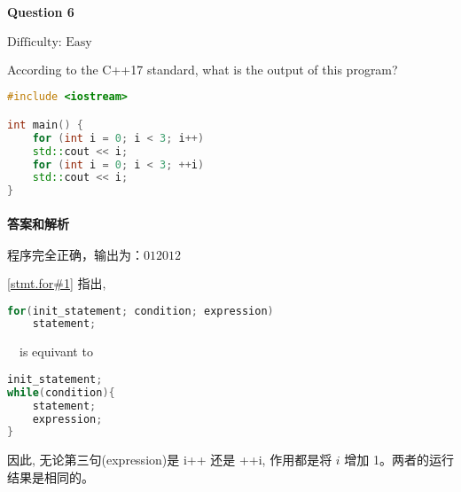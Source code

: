 \documentclass{article}
\begin{document}
	\paragraph*{Question 6}\noindent $\boxed{\text{Difficulty: Easy}} $
	
	According to the C++17 standard, what is the output of this program? 
	
	\begin{lstlisting}[language=C++]    
#include <iostream>

int main() {
	for (int i = 0; i < 3; i++)
	std::cout << i;
	for (int i = 0; i < 3; ++i)
	std::cout << i;
}	
	\end{lstlisting}
	
	\paragraph*{答案和解析} $\boxed{\text{程序完全正确，输出为：012012}} $
	
	\href{https://timsong-cpp.github.io/cppwp/n4659/stmt.for#1}{[stmt.for\#1]} 指出, 
	\begin{lightgrayleftbar}
	\begin{lstlisting}[language=C++]
for(init_statement; condition; expression) 
	statement;
	\end{lstlisting}
	\ \ is equivant to 
	\begin{lstlisting}[language=C++]
init_statement;
while(condition){
	statement;
	expression;
}
	\end{lstlisting}
	\end{lightgrayleftbar}

	因此, 无论第三句(expression)是 i++ 还是 ++i, 作用都是将 $i$ 增加 1。两者的运行结果是相同的。
	
\end{document}
